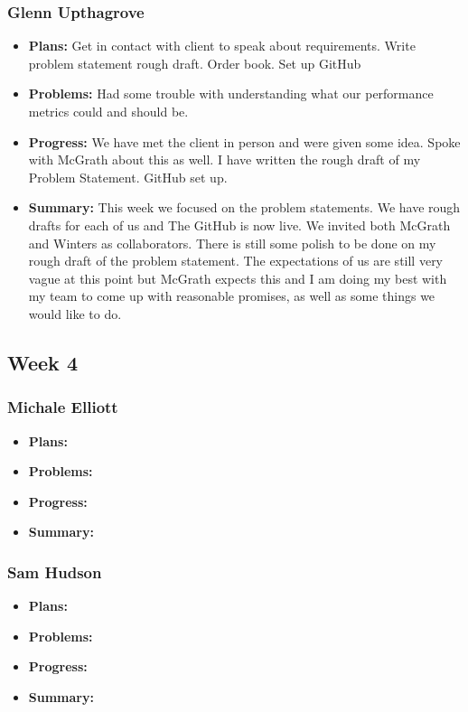 \documentclass[onecolumn, draftclsnofoot,10pt, compsoc]{IEEEtran}
\begin{document}
\subsubsection{Glenn Upthagrove}
\begin {itemize}
 \item \textbf{Plans: }Get in contact with client to speak about requirements. Write problem statement rough draft. Order book. Set up GitHub
 \item \textbf{Problems: }Had some trouble with understanding what our performance metrics could and should be. 
 \item \textbf{Progress: }We have met the client in person and were given some idea. Spoke with McGrath about this as well. I have written the rough draft of my Problem Statement. GitHub set up. 
 \item \textbf{Summary: }This week we focused on the problem statements. We have rough drafts for each of us and The GitHub is now live. We invited both McGrath and Winters as collaborators. There is still some polish to be done on my rough draft of the problem statement. The expectations of us are still very vague at this point but McGrath expects this and I am doing my best with my team to come up with reasonable promises, as well as some things we would like to do. 
\end {itemize}
\subsection {Week 4}
\subsubsection{Michale Elliott}
\begin {itemize}
 \item \textbf{Plans: }
 \item \textbf{Problems: }
 \item \textbf{Progress: }
 \item \textbf{Summary: }
\end {itemize}
\subsubsection{Sam Hudson}
\begin {itemize}
 \item \textbf{Plans: }
 \item \textbf{Problems: }
 \item \textbf{Progress: }
 \item \textbf{Summary: }
\end {itemize}
\end{document}
